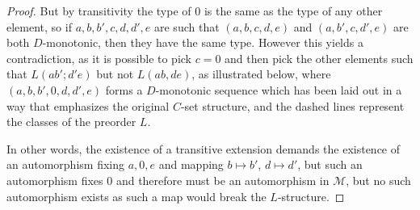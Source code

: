 \documentclass{amsart}
\newcommand{\model}{\mathcal{M}}
\begin{document}
\begin{proof}
    But by transitivity the type of $0$ is the same as the type of any other element, so if $a,b,b', c, d,d',e$ are such that $(a,b,c,d,e)$ and $(a, b', c, d', e)$ are both $D$-monotonic, then they have the same type. However this yields a contradiction, as it is possible to pick $c = 0$ and then pick the other elements such that $L(ab'; d'e)$ but not $L(ab, de)$, as illustrated below, where $(a,b,b',0,d,d',e)$ forms a $D$-monotonic sequence which has been laid out in a way that emphasizes the original $C$-set structure, and the dashed lines represent the classes of the preorder $L$.
    \begin{center}
    \end{center}

    In other words, the existence of a transitive extension demands the existence of an automorphism fixing $a, 0, e$ and mapping $b \mapsto b'$, $d \mapsto d'$, but such an automorphism fixes $0$ and therefore must be an automorphism in $\model$, but no such automorphism exists as such a map would break the $L$-structure.
\end{proof}







\end{document}
